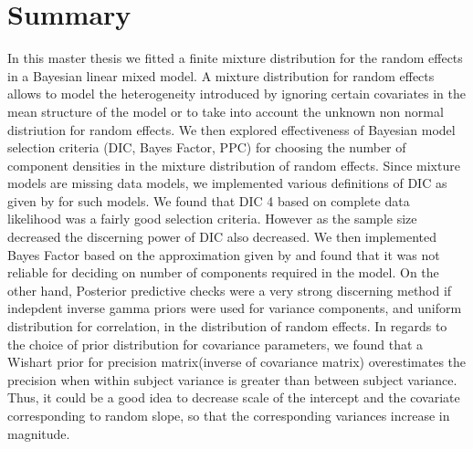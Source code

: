 
\chapter{Summary}
\label{ch : summary}


In this master thesis we fitted a finite mixture distribution for the random effects in a Bayesian linear mixed model. A mixture distribution for random effects allows to model the heterogeneity introduced by ignoring certain covariates in the mean structure of the model or to take into account the unknown non normal distriution for random effects. We then explored effectiveness of Bayesian model selection criteria (DIC, Bayes Factor, PPC) for choosing the number of component densities in the mixture distribution of random effects. Since mixture models are missing data models, we implemented various definitions of DIC as given by \citet{celeux_deviance_2006} for such models. We found that DIC 4 based on complete data likelihood was a fairly good selection criteria. However as the sample size decreased the discerning power of DIC also decreased. We then implemented Bayes Factor based on the approximation given by \citet{chib_marginal_1995} and found that it was not reliable for deciding on number of components required in the model. On the other hand, Posterior predictive checks were a very strong discerning method if indepdent inverse gamma priors were used for variance components, and uniform distribution for correlation, in the distribution of random effects. In regards to the choice of prior distribution for covariance parameters, we found that a Wishart prior for precision matrix(inverse of covariance matrix) overestimates the precision when within subject variance is greater than between subject variance. Thus, it could be a good idea to decrease scale of the intercept and the covariate corresponding to random slope, so that the corresponding variances increase in magnitude.